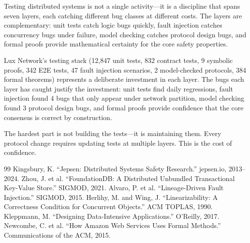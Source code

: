 \documentclass[11pt,a4paper]{article}
\begin{document}
Testing distributed systems is not a single activity---it is a discipline that spans
seven layers, each catching different bug classes at different costs. The layers are
complementary: unit tests catch logic bugs quickly, fault injection catches concurrency
bugs under failure, model checking catches protocol design bugs, and formal proofs
provide mathematical certainty for the core safety properties.

Lux Network's testing stack (12,847 unit tests, 832 contract tests, 9 symbolic proofs,
342 E2E tests, 47 fault injection scenarios, 2 model-checked protocols, 384 formal
theorems) represents a deliberate investment in each layer. The bugs each layer has
caught justify the investment: unit tests find daily regressions, fault injection found
4 bugs that only appear under network partition, model checking found 3 protocol design
bugs, and formal proofs provide confidence that the core consensus is correct by
construction.

The hardest part is not building the tests---it is maintaining them. Every protocol
change requires updating tests at multiple layers. This is the cost of confidence.

\begin{thebibliography}{99}
 Kingsbury, K. ``Jepsen: Distributed Systems Safety Research.'' jepsen.io, 2013--2024.
 Zhou, J. et al. ``FoundationDB: A Distributed Unbundled Transactional Key-Value Store.'' SIGMOD, 2021.
 Alvaro, P. et al. ``Lineage-Driven Fault Injection.'' SIGMOD, 2015.
 Herlihy, M. and Wing, J. ``Linearizability: A Correctness Condition for Concurrent Objects.'' ACM TOPLAS, 1990.
 Kleppmann, M. ``Designing Data-Intensive Applications.'' O'Reilly, 2017.
 Newcombe, C. et al. ``How Amazon Web Services Uses Formal Methods.'' Communications of the ACM, 2015.
\end{thebibliography}
\end{document}
